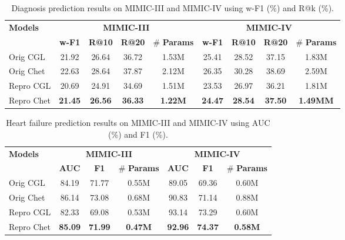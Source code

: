 \documentclass[11pt,a4paper,fleqn]{article}
\begin{document}
\begin{table*}[ht]
  \centering
  \begin{tabular}{lcccc|cccc} \hline \hline
    {\bf Models} & \multicolumn{4}{c}{\bf MIMIC-III} & \multicolumn{4}{c}{\bf MIMIC-IV} \\
    \cline{2-9} & \bf w-F1 & \bf R@10 & \bf R@20 & \# \bf Params & \bf w-F1 & \bf R@10 & \bf R@20 & \#
    \bf Params \\ \hline
    {Orig CGL} & 21.92 & 26.64 & 36.72 & 1.53M & 25.41 & 28.52 &
    37.15 & 1.83M \\
    {Orig Chet} & 22.63 & 28.64 & 37.87 & 2.12M 
    & 26.35 & 30.28 & 38.69 & 2.59M \\
    \hline
    {Repro CGL} & 20.69 & 24.91 & 34.69 & 1.51M & 23.53 & 26.97 &
    36.21 & 1.81M \\
    {Repro Chet} & \bf 21.45 & \bf 26.56 & \bf 36.33 & \bf 1.22M
    & \bf 24.47 & \bf 28.54 & \bf 37.50 & \bf 1.49MM \\ 
    \hline \hline
  \end{tabular}
  \caption{Diagnosis prediction results on MIMIC-III and MIMIC-IV using w-F1 (\%) and R@k (\%).}
  \label{tab:diag}
  \end{table*}

\begin{table*}[ht]
  \centering
  \begin{tabular}{lccc|ccc}
  \hline\hline
  {\bf Models} & \multicolumn{3}{c}{\bf MIMIC-III} & \multicolumn{3}{c}{\bf MIMIC-IV} \\
   \cline{2-7} & \bf AUC & \bf F1 & \# \bf Params & \bf AUC & \bf F1 & \# \bf Params \\ \hline
  {Orig CGL} & 84.19 & 71.77 & 0.55M & 89.05 & 69.36 & 0.60M \\
  {Orig Chet} & 86.14 & 73.08 & 0.68M & 90.83 & 71.14 & 0.88M \\
  \hline
  {Repro CGL} & 82.33 & 69.08 & 0.53M & 93.14 & 73.29 & 0.60M \\
  {Repro Chet} & \bf 85.09 & \bf 71.99 & \bf 0.47M & \bf 92.96 & \bf 74.37 & \bf 0.58M \\
  \hline\hline
  \end{tabular}
  \caption{Heart failure prediction results on MIMIC-III and MIMIC-IV using AUC (\%) and F1 (\%).}
  \label{tab:hf}
  \end{table*}
\end{document}
